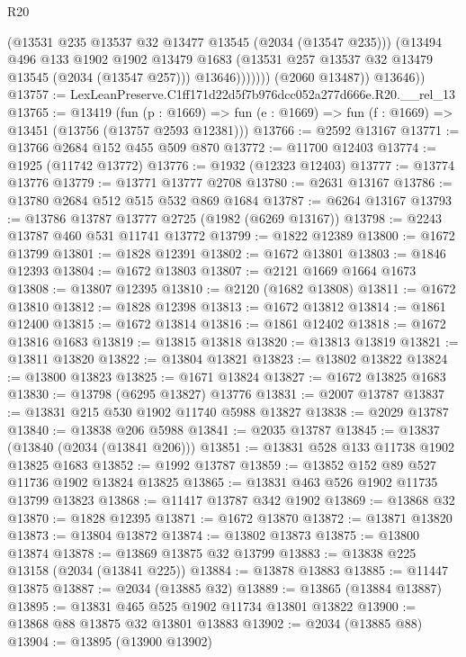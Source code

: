 \begin{lexlean}{R20}
\begin{coremodule}
                      (@13531 @235 @13537 @32 @13477 @13545 (@2034 (@13547 @235)))
                      (@13494
                        @496
                        @133
                        @1902
                        @1902
                        @13479
                        @1683
                        (@13531 @257 @13537 @32 @13479 @13545 (@2034 (@13547 @257)))
                        @13646)))))))
          (@2060 @13487))
        @13646))
@13757 := LexLeanPreserve.C1ff171d22d5f7b976dcc052a277d666e.R20.__rel_13
@13765 := @13419
    (fun (p : @1669) => fun (e : @1669) => fun (f : @1669) => @13451 (@13756 (@13757 @2593 @12381)))
@13766 := @2592 @13167
@13771 := @13766 @2684 @152 @455 @509 @870
@13772 := @11700 @12403
@13774 := @1925 (@11742 @13772)
@13776 := @1932 (@12323 @12403)
@13777 := @13774 @13776
@13779 := @13771 @13777 @2708
@13780 := @2631 @13167
@13786 := @13780 @2684 @512 @515 @532 @869 @1684
@13787 := @6264 @13167
@13793 := @13786 @13787 @13777 @2725 (@1982 (@6269 @13167))
@13798 := @2243 @13787 @460 @531 @11741 @13772
@13799 := @1822 @12389
@13800 := @1672 @13799
@13801 := @1828 @12391
@13802 := @1672 @13801
@13803 := @1846 @12393
@13804 := @1672 @13803
@13807 := @2121 @1669 @1664 @1673
@13808 := @13807 @12395
@13810 := @2120 (@1682 @13808)
@13811 := @1672 @13810
@13812 := @1828 @12398
@13813 := @1672 @13812
@13814 := @1861 @12400
@13815 := @1672 @13814
@13816 := @1861 @12402
@13818 := @1672 @13816 @1683
@13819 := @13815 @13818
@13820 := @13813 @13819
@13821 := @13811 @13820
@13822 := @13804 @13821
@13823 := @13802 @13822
@13824 := @13800 @13823
@13825 := @1671 @13824
@13827 := @1672 @13825 @1683
@13830 := @13798 (@6295 @13827) @13776
@13831 := @2007 @13787
@13837 := @13831 @215 @530 @1902 @11740 @5988 @13827
@13838 := @2029 @13787
@13840 := @13838 @206 @5988
@13841 := @2035 @13787
@13845 := @13837 (@13840 (@2034 (@13841 @206)))
@13851 := @13831 @528 @133 @11738 @1902 @13825 @1683
@13852 := @1992 @13787
@13859 := @13852 @152 @89 @527 @11736 @1902 @13824 @13825
@13865 := @13831 @463 @526 @1902 @11735 @13799 @13823
@13868 := @11417 @13787 @342 @1902
@13869 := @13868 @32
@13870 := @1828 @12395
@13871 := @1672 @13870
@13872 := @13871 @13820
@13873 := @13804 @13872
@13874 := @13802 @13873
@13875 := @13800 @13874
@13878 := @13869 @13875 @32 @13799
@13883 := @13838 @225 @13158 (@2034 (@13841 @225))
@13884 := @13878 @13883
@13885 := @11447 @13875
@13887 := @2034 (@13885 @32)
@13889 := @13865 (@13884 @13887)
@13895 := @13831 @465 @525 @1902 @11734 @13801 @13822
@13900 := @13868 @88 @13875 @32 @13801 @13883
@13902 := @2034 (@13885 @88)
@13904 := @13895 (@13900 @13902)

\end{coremodule}
\end{lexlean}
